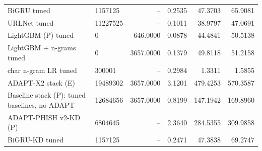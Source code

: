 \begin{table}[t]
\begin{tabular}{llrrrr}
BiGRU tuned & 1157125 & -- & 0.2535 & 47.3703 & 65.9081 \\
URLNet tuned & 11227525 & -- & 0.1011 & 38.9797 & 47.0691 \\
LightGBM (P) tuned & 0 & 646.0000 & 0.0878 & 44.4841 & 50.5138 \\
LightGBM + n-grams tuned & 0 & 3657.0000 & 0.1379 & 49.8118 & 51.2158 \\
char n-gram LR tuned & 300001 & -- & 0.2984 & 1.3311 & 1.5855 \\
ADAPT-X2 stack (E) & 19489302 & 3657.0000 & 3.1201 & 479.4253 & 570.3587 \\
Baseline stack (P): tuned baselines, no ADAPT & 12684656 & 3657.0000 & 0.8199 & 147.1942 & 169.8960 \\
ADAPT-PHISH v2-KD (P) & 6804645 & -- & 2.3640 & 284.5355 & 309.9858 \\
BiGRU-KD tuned & 1157125 & -- & 0.2471 & 47.3838 & 69.2747 \\
\bottomrule
\end{tabular}
\end{table}